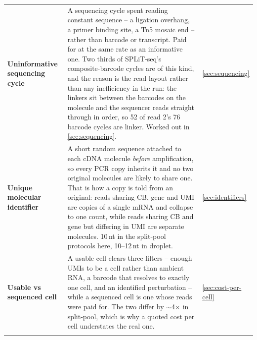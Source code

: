 \begin{longtable}{@{}>{\raggedright\arraybackslash}p{}>{\raggedright\arraybackslash}p{}>{\raggedright\arraybackslash}p{}@{}}
\addlinespace[5pt]
\textbf{Uninformative sequencing cycle} & A sequencing cycle spent reading constant sequence -- a ligation overhang, a primer binding site, a Tn5 mosaic end -- rather than barcode or transcript. Paid for at the same rate as an informative one. Two thirds of SPLiT-seq's composite-barcode cycles are of this kind, and the reason is the read layout rather than any inefficiency in the run: the linkers sit between the barcodes on the molecule and the sequencer reads straight through in order, so 52 of read 2's 76 barcode cycles are linker. Worked out in \cref{sec:sequencing}.~\citep{datlingerUltrahighthroughputSinglecellRNA2021} & \cref{sec:sequencing} \\
\addlinespace[5pt]
\textbf{Unique molecular identifier}\newline {\color{tcgray}(UMI)} & A short random sequence attached to each cDNA molecule \emph{before} amplification, so every PCR copy inherits it and no two original molecules are likely to share one. That is how a copy is told from an original: reads sharing CB, gene and UMI are copies of a single mRNA and collapse to one count, while reads sharing CB and gene but differing in UMI are separate molecules. 10\,nt in the split-pool protocols here, 10--12\,nt in droplet.~\citep{gaisserHighthroughputSinglecellTranscriptomics2024} & \cref{sec:identifiers} \\
\addlinespace[5pt]
\textbf{Usable vs sequenced cell} & A usable cell clears three filters -- enough UMIs to be a cell rather than ambient RNA, a barcode that resolves to exactly one cell, and an identified perturbation -- while a sequenced cell is one whose reads were paid for. The two differ by $\sim$4$\times$ in split-pool, which is why a quoted cost per cell understates the real one. & \cref{sec:cost-per-cell} \\
\addlinespace[5pt]
\end{longtable}
\endgroup

